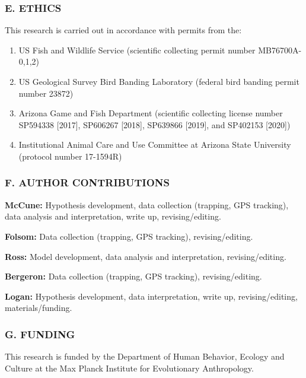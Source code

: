 \documentclass[
]{article}
\providecommand{\tightlist}{%
  \setlength{\itemsep}{0pt}\setlength{\parskip}{0pt}}
\begin{document}
\hypertarget{e.-ethics}{%
\subsubsection{E. ETHICS}\label{e.-ethics}}

This research is carried out in accordance with permits from the:

\begin{enumerate}
\def\labelenumi{\arabic{enumi})}
\tightlist
\item
  US Fish and Wildlife Service (scientific collecting permit number
  MB76700A-0,1,2)
\item
  US Geological Survey Bird Banding Laboratory (federal bird banding
  permit number 23872)
\item
  Arizona Game and Fish Department (scientific collecting license number
  SP594338 {[}2017{]}, SP606267 {[}2018{]}, SP639866 {[}2019{]}, and
  SP402153 {[}2020{]})
\item
  Institutional Animal Care and Use Committee at Arizona State
  University (protocol number 17-1594R)
\end{enumerate}

\hypertarget{f.-author-contributions}{%
\subsubsection{F. AUTHOR CONTRIBUTIONS}\label{f.-author-contributions}}

\textbf{McCune:} Hypothesis development, data collection (trapping, GPS
tracking), data analysis and interpretation, write up, revising/editing.

\textbf{Folsom:} Data collection (trapping, GPS tracking),
revising/editing.

\textbf{Ross:} Model development, data analysis and interpretation,
revising/editing.

\textbf{Bergeron:} Data collection (trapping, GPS tracking),
revising/editing.

\textbf{Logan:} Hypothesis development, data interpretation, write up,
revising/editing, materials/funding.

\hypertarget{g.-funding}{%
\subsubsection{G. FUNDING}\label{g.-funding}}

This research is funded by the Department of Human Behavior, Ecology and
Culture at the Max Planck Institute for Evolutionary Anthropology.
\end{document}
